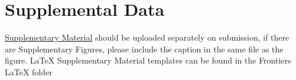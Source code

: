 \documentclass[utf8]{frontiersSCNS} %
\begin{document}
\section*{Supplemental Data}
 \href{http://home.frontiersin.org/about/author-guidelines#SupplementaryMaterial}{Supplementary Material} should be uploaded separately on submission, if there are Supplementary Figures, please include the caption in the same file as the figure. LaTeX Supplementary Material templates can be found in the Frontiers LaTeX folder 




\end{document}
